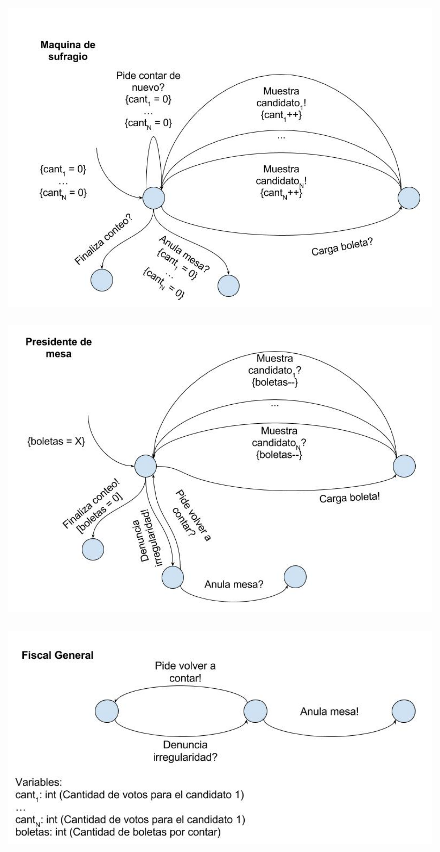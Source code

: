 \begin{figure}[h!]
\centering
\includegraphics[scale=0.5]{imagenes/FSMs/Conteo/Conteodevotosdeunamesa1}
\end{figure}			
\begin{figure}[h!]
\centering
\includegraphics[scale=0.5]{imagenes/FSMs/Conteo/Conteodevotosdeunamesa2}
\end{figure}
\newpage			
\begin{figure}[h!]
\centering
\includegraphics[scale=0.5]{imagenes/FSMs/Conteo/Conteodevotosdeunamesa3}
\end{figure}			
